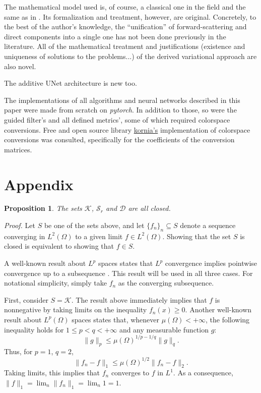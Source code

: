 \documentclass[twocolumn,twoside,a4paper,10pt]{IEEEtran}
\newtheorem{proposition}{Proposition}
\begin{document}
The mathematical model used is, of course, a classical one in the field and the same as in \cite{xie2021variational}. Its formalization and treatment, however, are original. Concretely, to the best of the author's knowledge, the ``unification'' of forward-scattering and direct components into a single one has
not been done previously in the literature. All of the mathematical treatment
and justifications (existence and uniqueness of solutions to the problems...) of
the derived variational approach are also novel.

The additive UNet architecture is new too.

The implementations of all algorithms and neural networks described in this
paper were made from scratch on \textit{pytorch}. In
addition to those, so were the guided filter's and all defined metrics', some of which required colorspace conversions. Free and open
source library \href{https://github.com/kornia/kornia}{kornia's} implementation
of colorspace conversions was consulted, specifically for the coefficients of
the conversion matrices.

\section{Appendix}

\begin{proposition}\label{prop:closed-sets}
  The sets \(\mathcal{K}\), \(\mathcal{S}_r\) and \(\mathcal{D}\) are all closed.
\end{proposition}
\textit{Proof.} 
Let \(S\) be one of the sets above, and let \(\{f_n\}_n\subseteq S\) denote a sequence converging in \(L^2(\Omega)\) to a given limit \(f\in L^2(\Omega)\). Showing that the set \(S\) is closed is equivalent to showing that \(f\in S\).

A well-known result about \(L^p\) spaces states that \(L^p\) convergence implies pointwise convergence up to a subsequence \cite{ash1972real}. This result will be used in all three cases. For notational simplicity, simply take \(f_n\) as the converging subsequence.

First, consider \(S=\mathcal{K}\). The result above immediately implies that \(f\) is nonnegative by taking limits on the inequality \(f_n(x) \geq 0\). Another well-known result about \(L^p(\Omega)\) spaces states that, whenever \(\mu(\Omega)<+\infty\), the following inequality holds for \(1\leq p < q < +\infty\) and any measurable function \(g\):
\[
  \|g\|_p \leq \mu(\Omega)^{1/p - 1/q} \|g\|_q
.\]
Thus, for \(p=1\), \(q=2\),
\[
  \|f_n-f\|_1 \leq \mu(\Omega)^{1/2}\|f_n - f\|_2
.\]
Taking limits, this implies that \(f_n\) converges to \(f\) in \(L^1\). As a consequence, \(\|f\|_{1}=\lim_n \|f_n\|_{1}=\lim_n 1 = 1\).
\end{document}
